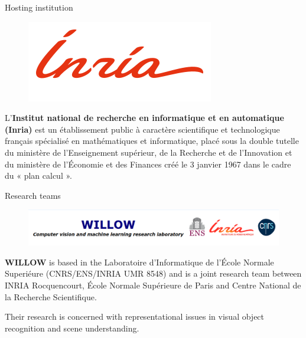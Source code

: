 \documentclass{beamer}
\begin{document}
\begin{frame}{Hosting institution}

\begin{figure}
\includegraphics[scale=0.35]{images/Inr_logo_fr_rouge.png}
\end{figure}
L'\textbf{Institut national de recherche en informatique et en automatique (Inria)} est un établissement public à caractère scientifique et technologique français spécialisé en mathématiques et informatique, placé sous la double tutelle du ministère de l'Enseignement supérieur, de la Recherche et de l'Innovation et du ministère de l'Économie et des Finances créé le 3 janvier 1967 dans le cadre du « plan calcul ».





\end{frame}


\begin{frame}{Research teams}

\begin{figure}
\includegraphics[scale=0.3]{images/WILLOW_Research.png}
\end{figure}

\textbf{WILLOW} is based in the Laboratoire d'Informatique de l'École Normale Superiéure (CNRS/ENS/INRIA UMR 8548) and is a joint research team between INRIA Rocquencourt, École Normale Supérieure de Paris and Centre National de la Recherche Scientifique. 

Their research is concerned with representational issues in visual object recognition and scene understanding. 



\end{frame}

%
%
\end{document}
